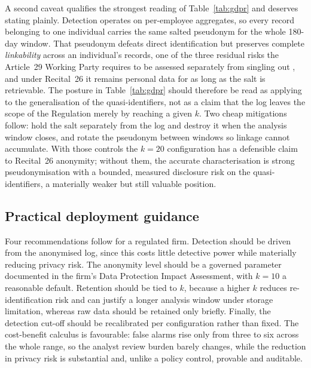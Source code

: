 \documentclass[10pt,a4paper]{article}
\begin{document}
A second caveat qualifies the strongest reading of Table~\ref{tab:gdpr} and deserves stating plainly. Detection operates on per-employee aggregates, so every record belonging to one individual carries the same salted pseudonym for the whole 180-day window. That pseudonym defeats direct identification but preserves complete \emph{linkability} across an individual's records, one of the three residual risks the Article~29 Working Party requires to be assessed separately from singling out \cite{wp29anon2014}, and under Recital~26 it remains personal data for as long as the salt is retrievable. The posture in Table~\ref{tab:gdpr} should therefore be read as applying to the generalisation of the quasi-identifiers, not as a claim that the log leaves the scope of the Regulation merely by reaching a given $k$. Two cheap mitigations follow: hold the salt separately from the log and destroy it when the analysis window closes, and rotate the pseudonym between windows so linkage cannot accumulate. With those controls the $k=20$ configuration has a defensible claim to Recital~26 anonymity; without them, the accurate characterisation is strong pseudonymisation with a bounded, measured disclosure risk on the quasi-identifiers, a materially weaker but still valuable position.

\subsection{Practical deployment guidance}
Four recommendations follow for a regulated firm. Detection should be driven from the anonymised log, since this costs little detective power while materially reducing privacy risk. The anonymity level should be a governed parameter documented in the firm's Data Protection Impact Assessment, with $k=10$ a reasonable default. Retention should be tied to $k$, because a higher $k$ reduces re-identification risk and can justify a longer analysis window under storage limitation, whereas raw data should be retained only briefly. Finally, the detection cut-off should be recalibrated per configuration rather than fixed. The cost-benefit calculus is favourable: false alarms rise only from three to six across the whole range, so the analyst review burden barely changes, while the reduction in privacy risk is substantial and, unlike a policy control, provable and auditable.
\end{document}
